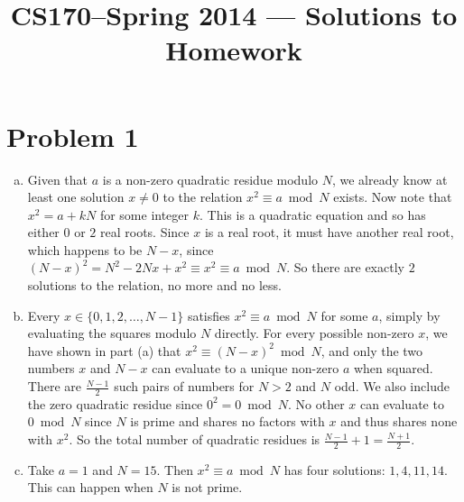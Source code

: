 \documentclass[11pt]{article}
\title{CS170--Spring 2014 --- Solutions to Homework \Homework}
\author{\Name}
\newcounter{problemnumber}
\begin{document}
\maketitle
\setcounter{problemnumber}{0}

\section*{Problem 1}
\begin{enumerate}[(a)]
\item Given that $a$ is a non-zero quadratic residue modulo $N$, we already know at least one solution $x\neq 0$ to the relation $x^2 \equiv a \bmod N$ exists. Now note that $x^2 = a+kN$ for some integer $k$. This is a quadratic equation and so has either $0$ or $2$ real roots. Since $x$ is a real root, it must have another real root, which happens to be $N-x$, since $(N-x)^2 = N^2-2Nx+x^2 \equiv x^2 \equiv a \bmod N$. So there are exactly $2$ solutions to the relation, no more and no less.
\item Every $x \in \{0,1,2,\ldots,N-1\}$ satisfies $x^2 \equiv a \bmod N$ for some $a$, simply by evaluating the squares modulo $N$ directly. For every possible non-zero $x$, we have shown in part (a) that $x^2 \equiv (N-x)^2 \bmod N$, and only the two numbers $x$ and $N-x$ can evaluate to a unique non-zero $a$ when squared. There are $\frac{N-1}2$ such pairs of numbers for $N>2$ and $N$ odd. We also include the zero quadratic residue since $0^2 = 0 \bmod N$. No other $x$ can evaluate to $0 \bmod N$ since $N$ is prime and shares no factors with $x$ and thus shares none with $x^2$. So the total number of quadratic residues is $\frac{N-1}2 + 1 = \frac{N+1}2$.
\item Take $a=1$ and $N=15$. Then $x^2 \equiv a \bmod N$ has four solutions: $1,4,11,14$. This can happen when $N$ is not prime.
\end{enumerate}


\newpage
\end{document}
